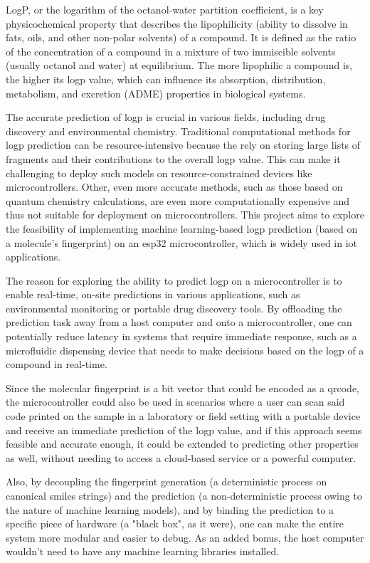 \documentclass[12pt,a4paper,twoside,open=any]{scrreprt}
\begin{document}
LogP, or the logarithm of the octanol-water partition coefficient, is a key physicochemical property that describes the lipophilicity (ability to dissolve in fats, oils, and other non-polar solvents) of a compound. 
It is defined as the ratio of the concentration of a compound in a mixture of two immiscible solvents (usually octanol and water) at equilibrium.
The more lipophilic a compound is, the higher its \gls{logp} value, which can influence its absorption, distribution, metabolism, and excretion (ADME) properties in biological systems.

The accurate prediction of \gls{logp} is crucial in various fields, including drug discovery and environmental chemistry. 
Traditional computational methods for \gls{logp} prediction can be resource-intensive because the rely on storing large lists of fragments and their contributions to the overall \gls{logp} value. 
This can make it challenging to deploy such models on resource-constrained devices like microcontrollers.
Other, even more accurate methods, such as those based on quantum chemistry calculations, are even more computationally expensive and thus not suitable for deployment on microcontrollers.
This project aims to explore the feasibility of implementing machine learning-based \gls{logp} prediction (based on a molecule's \gls{fingerprint}) on an \gls{esp32} microcontroller, which is widely used in \gls{iot} applications.

The reason for exploring the ability to predict \gls{logp} on a microcontroller is to enable real-time, on-site predictions in various applications, such as environmental monitoring or portable drug discovery tools.
By offloading the prediction task away from a host computer and onto a microcontroller, one can potentially reduce latency in systems that require immediate response,
such as a microfluidic dispensing device that needs to make decisions based on the \gls{logp} of a compound in real-time.

Since the molecular \gls{fingerprint} is a bit vector that could be encoded as a \gls{qrcode}, the microcontroller could also be used in scenarios where a user can scan said code printed on the sample in a laboratory or field setting with a portable device and receive an immediate prediction of the \gls{logp} value,
and if this approach seems feasible and accurate enough, it could be extended to predicting other properties as well, without needing to access a cloud-based service or a powerful computer.

Also, by decoupling the \gls{fingerprint} generation (a deterministic process on canonical \gls{smiles} strings) and the prediction (a non-deterministic process owing to the nature of machine learning models),
and by binding the prediction to a specific piece of hardware (a "black box", as it were), one can make the entire system more modular and easier to debug. As an added bonus, the host computer wouldn't need to have any machine learning libraries installed.
\end{document}
